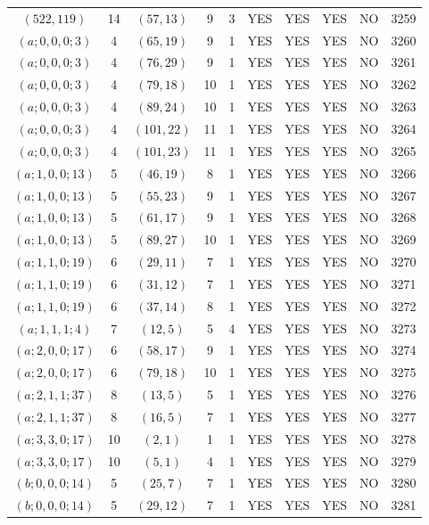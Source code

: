 \begin{longtable}{|c|c|c|c|c|c|c|c|c|c|}
$(522, 119)$ & 14 & $(57, 13)$ & 9 & 3 & YES & YES & YES & NO & 3259\\
$(a; 0, 0, 0; 3)$ & 4 & $(65, 19)$ & 9 & 1 & YES & YES & YES & NO & 3260\\
$(a; 0, 0, 0; 3)$ & 4 & $(76, 29)$ & 9 & 1 & YES & YES & YES & NO & 3261\\
$(a; 0, 0, 0; 3)$ & 4 & $(79, 18)$ & 10 & 1 & YES & YES & YES & NO & 3262\\
$(a; 0, 0, 0; 3)$ & 4 & $(89, 24)$ & 10 & 1 & YES & YES & YES & NO & 3263\\
$(a; 0, 0, 0; 3)$ & 4 & $(101, 22)$ & 11 & 1 & YES & YES & YES & NO & 3264\\
$(a; 0, 0, 0; 3)$ & 4 & $(101, 23)$ & 11 & 1 & YES & YES & YES & NO & 3265\\
$(a; 1, 0, 0; 13)$ & 5 & $(46, 19)$ & 8 & 1 & YES & YES & YES & NO & 3266\\
$(a; 1, 0, 0; 13)$ & 5 & $(55, 23)$ & 9 & 1 & YES & YES & YES & NO & 3267\\
$(a; 1, 0, 0; 13)$ & 5 & $(61, 17)$ & 9 & 1 & YES & YES & YES & NO & 3268\\
$(a; 1, 0, 0; 13)$ & 5 & $(89, 27)$ & 10 & 1 & YES & YES & YES & NO & 3269\\
$(a; 1, 1, 0; 19)$ & 6 & $(29, 11)$ & 7 & 1 & YES & YES & YES & NO & 3270\\
$(a; 1, 1, 0; 19)$ & 6 & $(31, 12)$ & 7 & 1 & YES & YES & YES & NO & 3271\\
$(a; 1, 1, 0; 19)$ & 6 & $(37, 14)$ & 8 & 1 & YES & YES & YES & NO & 3272\\
$(a; 1, 1, 1; 4)$ & 7 & $(12, 5)$ & 5 & 4 & YES & YES & YES & NO & 3273\\
$(a; 2, 0, 0; 17)$ & 6 & $(58, 17)$ & 9 & 1 & YES & YES & YES & NO & 3274\\
$(a; 2, 0, 0; 17)$ & 6 & $(79, 18)$ & 10 & 1 & YES & YES & YES & NO & 3275\\
$(a; 2, 1, 1; 37)$ & 8 & $(13, 5)$ & 5 & 1 & YES & YES & YES & NO & 3276\\
$(a; 2, 1, 1; 37)$ & 8 & $(16, 5)$ & 7 & 1 & YES & YES & YES & NO & 3277\\
$(a; 3, 3, 0; 17)$ & 10 & $(2, 1)$ & 1 & 1 & YES & YES & YES & NO & 3278\\
$(a; 3, 3, 0; 17)$ & 10 & $(5, 1)$ & 4 & 1 & YES & YES & YES & NO & 3279\\
$(b; 0, 0, 0; 14)$ & 5 & $(25, 7)$ & 7 & 1 & YES & YES & YES & NO & 3280\\
$(b; 0, 0, 0; 14)$ & 5 & $(29, 12)$ & 7 & 1 & YES & YES & YES & NO & 3281\\

\end{longtable}
